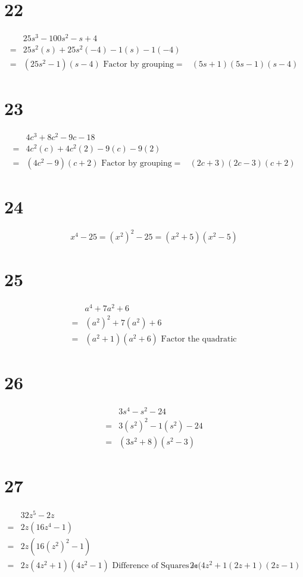 \documentclass{article}
\theoremstyle{definition}
\begin{document}
\section*{22}
\[
\begin{array}{rl}
	& 25s^3-100s^2-s+4 \\
=	& 25s^2(s)+25s^2(-4)-1(s)-1(-4) \\
=	& (25s^2-1)(s-4)\textrm{ Factor by grouping}
=	& (5s+1)(5s-1)(s-4)
\end{array}
\]

\section*{23}
\[
\begin{array}{rl}
	& 4c^3+8c^2-9c-18 \\
=	& 4c^2(c)+4c^2(2)-9(c)-9(2) \\
=	& (4c^2-9)(c+2)\textrm{ Factor by grouping}
=	& (2c+3)(2c-3)(c+2)
\end{array}
\]

\section*{24}
\[ x^4-25=(x^2)^2-25=(x^2+5)(x^2-5) \]

\section*{25}
\[
\begin{array}{rl}
	& a^4+7a^2+6 \\
=	& (a^2)^2+7(a^2)+6 \\
=	& (a^2+1)(a^2+6)\textrm{ Factor the quadratic}
\end{array}
\]

\section*{26}
\[
\begin{array}{rl}
	& 3s^4-s^2-24 \\
=	& 3(s^2)^2-1(s^2)-24 \\
=	& (3s^2+8)(s^2-3)
\end{array}
\]

\section*{27}
\[
\begin{array}{rl}
	& 32z^5-2z \\
=	& 2z(16z^4-1) \\
=	& 2z(16(z^2)^2-1) \\
=	& 2z(4z^2+1)(4z^2-1)\textrm{ Difference of Squares}
=	& 2z(4z^2+1(2z+1)(2z-1)
\end{array}
\]
\end{document}
